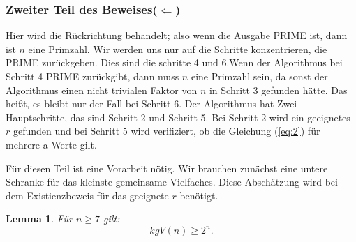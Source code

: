 \documentclass[12pt,oneside]{article}
\newtheorem{lemma}[theorem]{Lemma}
\theoremstyle{remark}
\theoremstyle{definition}
\begin{document}
\subsubsection{Zweiter Teil des Beweises($\Leftarrow$)}

Hier wird die Rückrichtung behandelt; also  wenn die Ausgabe PRIME ist, dann ist $n$ eine Primzahl. Wir werden uns nur auf die Schritte konzentrieren, die PRIME zurückgeben. Dies sind die schritte 4 und 6.\newline\newline Wenn der Algorithmus bei Schritt 4 PRIME zurückgibt, dann muss $n$ eine Primzahl sein, da sonst der Algorithmus einen nicht trivialen Faktor von $n$ in Schritt 3 gefunden hätte. Das heißt, es bleibt nur der Fall bei Schritt 6. Der Algorithmus hat Zwei Hauptschritte, das sind Schritt 2 und Schritt 5. Bei Schritt 2 wird ein geeignetes $r$ gefunden und bei Schritt 5 wird verifiziert, ob die Gleichung (\ref{eq:2}) für mehrere a Werte gilt.    

Für diesen Teil ist eine Vorarbeit nötig. Wir brauchen zunächst eine untere Schranke für das kleinste gemeinsame Vielfaches. Diese Abschätzung wird bei dem Existienzbeweis für das geeignete $r$ benötigt.


\begin{lemma}\label{lemma_1}
Für $n \geq 7$ gilt:\newline
\begin{equation}
    kgV(n) \geq 2^n.  
\end{equation}
\end{lemma}
\end{document}
